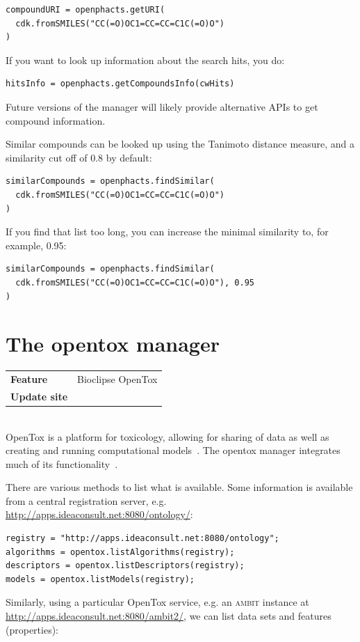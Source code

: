 \documentclass[a5paper, 10pt]{memoir}
\begin{document}
\begin{refsection}
\begin{Verbatim}
compoundURI = openphacts.getURI(
  cdk.fromSMILES("CC(=O)OC1=CC=CC=C1C(=O)O")
)
\end{Verbatim}
If you want to look up information about the search hits, you do:

\begin{Verbatim}
hitsInfo = openphacts.getCompoundsInfo(cwHits)
\end{Verbatim}
Future versions of the manager will likely provide alternative APIs to get
compound information.

Similar compounds can be looked up using the Tanimoto distance measure, and a
similarity cut off of 0.8 by default:

\begin{Verbatim}
similarCompounds = openphacts.findSimilar(
  cdk.fromSMILES("CC(=O)OC1=CC=CC=C1C(=O)O")
)
\end{Verbatim}
If you find that list too long, you can increase the minimal similarity to, for
example, 0.95:

\begin{Verbatim}
similarCompounds = openphacts.findSimilar(
  cdk.fromSMILES("CC(=O)OC1=CC=CC=C1C(=O)O"), 0.95
)
\end{Verbatim}

\section{The opentox manager}

\begin{tabular}{ll}
\textbf{Feature} & Bioclipse OpenTox \\
\textbf{Update site} & \url{} \\
\end{tabular} \\

\noindent
OpenTox is a platform for toxicology, allowing for sharing of
data as well as creating and running computational
models~\cite{hardy2010collaborative}. The opentox manager integrates much of its
functionality~\cite{willighagen2011computational}.

There are various methods to list what is available. Some information is
available from a central registration server, e.g.
\url{http://apps.ideaconsult.net:8080/ontology/}:

\begin{Verbatim}
registry = "http://apps.ideaconsult.net:8080/ontology";
algorithms = opentox.listAlgorithms(registry);
descriptors = opentox.listDescriptors(registry);
models = opentox.listModels(registry);
\end{Verbatim}
Similarly, using a particular OpenTox service, e.g. an
\textsc{ambit} instance at
\url{http://apps.ideaconsult.net:8080/ambit2/}\cite{jeliazkova2011ambit}, we
can list data sets and features
(properties):


\end{refsection}
\end{document}
